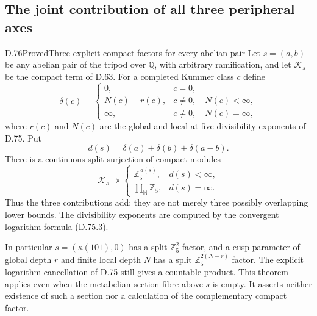\subsection{The joint contribution of all three peripheral axes}

\begin{statement}{D.76}{Proved}{Three explicit compact factors for every abelian pair}
Let \(s=(a,b)\) be any abelian pair of the tripod over \(\mathbb Q\),
with arbitrary ramification, and let \(\mathcal K_s\) be the compact
term of D.63. For a completed Kummer class \(c\) define
\[
 \delta(c)=
 \begin{cases}
 0,&c=0,\\
 N(c)-r(c),&c\ne0,\quad N(c)<\infty,\\
 \infty,&c\ne0,\quad N(c)=\infty,
 \end{cases}                                               \tag{D.76.1}
\]
where \(r(c)\) and \(N(c)\) are the global and local-at-five
divisibility exponents of D.75. Put
\[
                     d(s)=\delta(a)+\delta(b)+\delta(a-b).
                                                               \tag{D.76.2}
\]
There is a continuous split surjection of compact modules
\[
 \mathcal K_s\twoheadrightarrow
 \begin{cases}
       \mathbb Z_5^{\,d(s)},&d(s)<\infty,\\
       \displaystyle\prod_{\mathbb N}\mathbb Z_5,&d(s)=\infty.
 \end{cases}                                               \tag{D.76.3}
\]
Thus the three contributions add: they are not merely three
possibly overlapping lower bounds.
The divisibility exponents are computed by the convergent
logarithm formula (D.75.3).

In particular \(s=(\kappa(101),0)\) has a split
\(\mathbb Z_5^2\) factor, and a cusp parameter of global
depth \(r\) and finite local depth \(N\) has a split
\(\mathbb Z_5^{2(N-r)}\) factor. The explicit logarithm
cancellation of D.75 still gives a countable product.
This theorem applies even when the metabelian section fibre
above \(s\) is empty. It asserts neither existence of such
a section nor a calculation of the complementary compact factor.
\end{statement}

